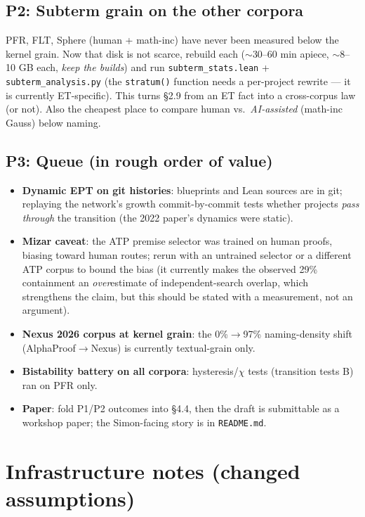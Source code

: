 \documentclass[11pt]{article}
\newcommand{\code}[1]{\texttt{#1}}
\begin{document}
\subsection{P2: Subterm grain on the other corpora}
PFR, FLT, Sphere (human + math-inc) have never been measured below the kernel grain. Now
that disk is not scarce, rebuild each ($\sim$30--60 min apiece, $\sim$8--10 GB each,
\emph{keep the builds}) and run \code{subterm\_stats.lean} + \code{subterm\_analysis.py}
(the \code{stratum()} function needs a per-project rewrite --- it is currently
ET-specific). This turns \S2.9 from an ET fact into a cross-corpus law (or not). Also the
cheapest place to compare human vs.\ \emph{AI-assisted} (math-inc Gauss) below naming.

\subsection{P3: Queue (in rough order of value)}
\begin{itemize}[leftmargin=1.4em, itemsep=1pt]
\item \textbf{Dynamic EPT on git histories}: blueprints and Lean sources are in git;
  replaying the network's growth commit-by-commit tests whether projects \emph{pass
  through} the transition (the 2022 paper's dynamics were static).
\item \textbf{Mizar caveat}: the ATP premise selector was trained on human proofs, biasing
  toward human routes; rerun with an untrained selector or a different ATP corpus to bound
  the bias (it currently makes the observed 29\% containment an \emph{over}estimate of
  independent-search overlap, which strengthens the claim, but this should be stated with a
  measurement, not an argument).
\item \textbf{Nexus 2026 corpus at kernel grain}: the 0\%$\to$97\% naming-density shift
  (AlphaProof$\to$Nexus) is currently textual-grain only.
\item \textbf{Bistability battery on all corpora}: hysteresis/$\chi$ tests (transition tests
  B) ran on PFR only.
\item \textbf{Paper}: fold P1/P2 outcomes into \S4.4, then the draft is submittable as a
  workshop paper; the Simon-facing story is in \code{README.md}.
\end{itemize}

\section{Infrastructure notes (changed assumptions)}
\end{document}
